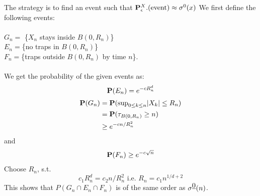 \documentclass[main]{subfiles}
\begin{document}
The strategy is to find an event such that $\P^X_{\epsilon}.(\text{event})\approx \sigma^{0}(x)$
We first define the following events:\\\\
$G_n=$ \{$X_n$ stays inside $B(0,R_n)$\}\\
$E_n=$\{no traps in $B(0,R_n)$\}\\
$F_n=$\{traps outside $B(0,R_n)$ by time $n$\}.\\\\
We get the probability of the given events as:
\begin{equation}
    \P(E_n)=e^{-cR_n^d}
\end{equation}
\begin{equation}
    \begin{aligned}
        \P(G_n) & =\P(\text{sup}_{0\leq k\leq n}|X_k|\leq R_n) \\
                & =\P(\tau_{B(0,R_n)}\geq n)                   \\
                & \geq e^{-cn/{R_n^2}}
    \end{aligned}
\end{equation}
and
\begin{equation}
    \begin{aligned}
        \P(F_n)\geq e^{-c\sqrt{n}}
    \end{aligned}
\end{equation}
Choose $R_n$, s.t.
$$
    c_1 R_n^d=c_2 n / R_n^2 \text{ i.e. } R_n=c_1 n^{1 / d+2}
$$
This shows that $P(G_n\cap E_n \cap F_n)$ is of the same order as $\sigma^\zero (n)$.
\end{document}
